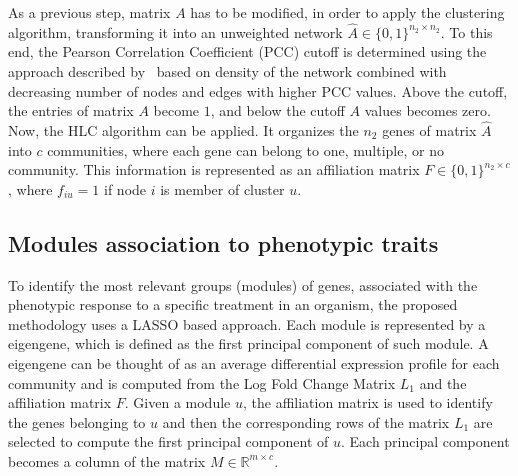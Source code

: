 \documentclass[12pt,journal, onecolumn]{IEEEtran}
\begin{document}

As a previous step, matrix $A$ has to be modified, in order to apply the clustering algorithm, transforming it into an unweighted network $\hat{A} \in \{0,1\}^{n_2 \times n_2}$. To this end, the Pearson Correlation Coefficient (PCC) cutoff is determined using the approach described by~\cite{aoki2007approaches} based on density of the network combined with decreasing number of nodes and edges with higher PCC values. Above the cutoff, the entries of matrix $A$ become $1$, and below the cutoff $A$ values becomes zero.\\


Now, the HLC algorithm can be applied. It organizes the $n_2$ genes of matrix $\hat{A}$ into $c$ communities, where each gene can belong to one, multiple, or no community. This information is represented as an affiliation matrix $F \in \{0,1\}^{n_2 \times c}$, where $f_{iu} = 1$ if node $i$ is member of cluster $u$.\\ 

\subsection{Modules association to phenotypic traits}

To identify the most relevant groups (modules) of genes, associated with the phenotypic response to a specific treatment in an organism, the proposed methodology uses a LASSO based approach. Each module is represented by a eigengene, which is defined as the first principal component of such module. A eigengene can be thought of as an average differential expression profile for each community and is computed from the Log Fold Change Matrix $L_1$ and the affiliation matrix $F$. Given a module $u$, the affiliation matrix is used to identify the genes belonging to $u$ and then the corresponding rows of the matrix $L_1$ are selected to compute the first principal component of $u$. Each principal component becomes a column of the matrix $M \in \mathbb{R}^{m \times c}$.\\   
\end{document}
